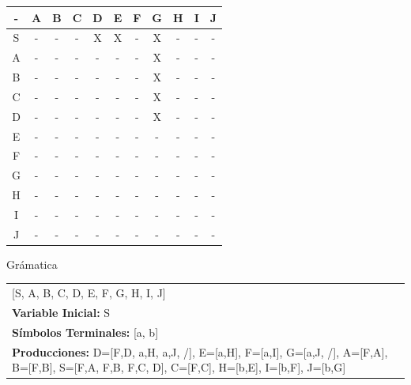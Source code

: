 \documentclass[a4paper,11pt]{article}
\newcommand{\MYp}[1]{ {\color[rgb]{0.392,0.392,0.392}#1} }
\begin{document}
\begin{center}
\begin{tabular}{||c||c||c||c||c||c||c||c||c||c||c||}
\hline
\hline
- & A & B & C & D & E & F & G & H & I & J \\
\hline
\hline
S & - & - & - & X & X & - & X & - & - & - \\
\hline
\hline
A & - & - & - & - & - & - & X & - & - & - \\
\hline
\hline
B & - & - & - & - & - & - & X & - & - & - \\
\hline
\hline
C & - & - & - & - & - & - & X & - & - & - \\
\hline
\hline
D & - & - & - & - & - & - & X & - & - & - \\
\hline
\hline
E & - & - & - & - & - & - & - & - & - & - \\
\hline
\hline
F & - & - & - & - & - & - & - & - & - & - \\
\hline
\hline
G & - & - & - & - & - & - & - & - & - & - \\
\hline
\hline
H & - & - & - & - & - & - & - & - & - & - \\
\hline
\hline
I & - & - & - & - & - & - & - & - & - & - \\
\hline
\hline
J & - & - & - & - & - & - & - & - & - & - \\
\hline
\hline
\end{tabular}
\end{center}

\MYp{\Huge Gr\'amatica}
\newline

\begin{center}\begin{tabular}{ m{15cm} }

\noindent {\bf Variables: }[S, A, B, C, D, E, F, G, H, I, J] \\
{\bf Variable Inicial: }S \\ 
{\bf S\'{i}mbolos Terminales: }[a, b] \\ 
{\bf Producciones: }{D=[F,D, a,H, a,J, /], E=[a,H], F=[a,I], G=[a,J, /], A=[F,A], B=[F,B], S=[F,A, F,B, F,C, D], C=[F,C], H=[b,E], I=[b,F], J=[b,G]} \\ 
\end{tabular}
\end{center}
\end{document}

